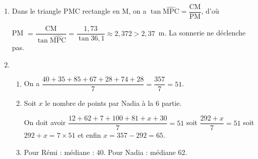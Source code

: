 \begin{enumerate} 
\item Dans le triangle PMC rectangle en M, on a $\tan \widehat{\text{MPC}} = \dfrac{\text{CM}}{\text{PM}}$, d'où 

PM $ = \dfrac{\text{CM}}{\tan \widehat{\text{MPC}}} = \dfrac{1,73}{\tan 36,1} \approx 2,372 > 2,37$~m. La sonnerie ne déclenche pas.
\item%


	\begin{enumerate}
		\item %
On a $\dfrac{40+35+85+67+28+74+28}{7} = \dfrac{357}{7} = 51$. 
		\item %
Soit $x$ le nombre de points par Nadia à la 6 partie. 

On doit avoir $\dfrac{12+62+7+100+81+x+30}{7} = 51$ soit  $\dfrac{292+x}{7} = 51$ soit $292 + x = 7\times 51$ et enfin $x = 357 - 292 = 65$.
		\item %
Pour Rémi : médiane : 40. Pour Nadia : médiane 62. 
	\end{enumerate}
\end{enumerate}

\bigskip

